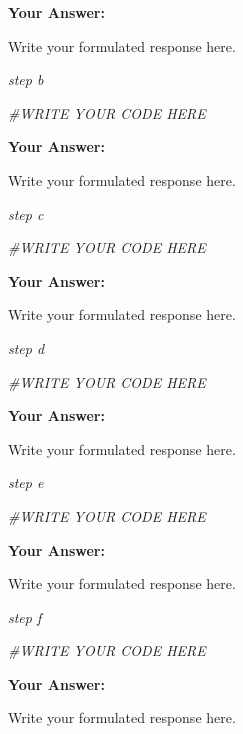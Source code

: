 \documentclass[
]{article}
\newenvironment{Shaded}{\begin{snugshade}}{\end{snugshade}}
\newcommand{\CommentTok}[1]{\textcolor[rgb]{0.56,0.35,0.01}{\textit{#1}}}
\begin{document}
\textbf{Your Answer:}

Write your formulated response here.

\emph{step b}

\begin{Shaded}
\begin{Highlighting}[]
\CommentTok{\#WRITE YOUR CODE HERE}
\end{Highlighting}
\end{Shaded}

\textbf{Your Answer:}

Write your formulated response here.

\emph{step c}

\begin{Shaded}
\begin{Highlighting}[]
\CommentTok{\#WRITE YOUR CODE HERE}
\end{Highlighting}
\end{Shaded}

\textbf{Your Answer:}

Write your formulated response here.

\emph{step d}

\begin{Shaded}
\begin{Highlighting}[]
\CommentTok{\#WRITE YOUR CODE HERE}
\end{Highlighting}
\end{Shaded}

\textbf{Your Answer:}

Write your formulated response here.

\emph{step e}

\begin{Shaded}
\begin{Highlighting}[]
\CommentTok{\#WRITE YOUR CODE HERE}
\end{Highlighting}
\end{Shaded}

\textbf{Your Answer:}

Write your formulated response here.

\emph{step f}

\begin{Shaded}
\begin{Highlighting}[]
\CommentTok{\#WRITE YOUR CODE HERE}
\end{Highlighting}
\end{Shaded}

\textbf{Your Answer:}

Write your formulated response here.
\end{document}
